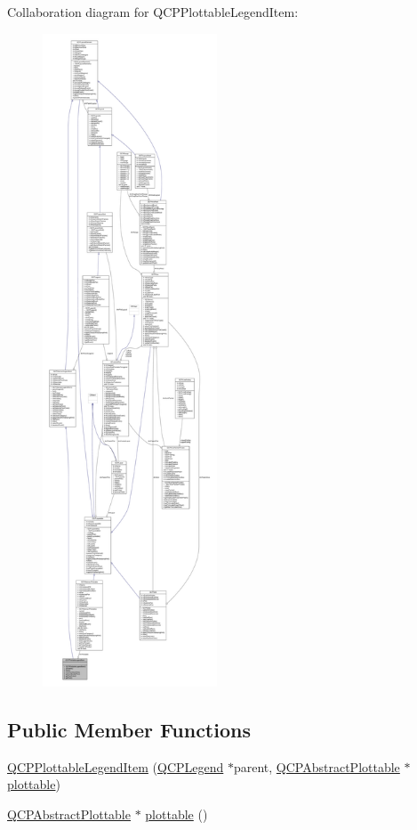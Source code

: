 Collaboration diagram for Q\+C\+P\+Plottable\+Legend\+Item\+:\nopagebreak
\begin{figure}[H]
\begin{center}
\leavevmode
\includegraphics[height=550pt]{class_q_c_p_plottable_legend_item__coll__graph}
\end{center}
\end{figure}
\subsection*{Public Member Functions}
\begin{DoxyCompactItemize}
\item 
\hyperlink{class_q_c_p_plottable_legend_item_ac1072591fe409d3dabad51b23ee4d6c5}{Q\+C\+P\+Plottable\+Legend\+Item} (\hyperlink{class_q_c_p_legend}{Q\+C\+P\+Legend} $\ast$parent, \hyperlink{class_q_c_p_abstract_plottable}{Q\+C\+P\+Abstract\+Plottable} $\ast$\hyperlink{class_q_c_p_plottable_legend_item_af29e9a2c60b4cba0cac2447b8af7b488}{plottable})
\item 
\hyperlink{class_q_c_p_abstract_plottable}{Q\+C\+P\+Abstract\+Plottable} $\ast$ \hyperlink{class_q_c_p_plottable_legend_item_af29e9a2c60b4cba0cac2447b8af7b488}{plottable} ()
\end{DoxyCompactItemize}
